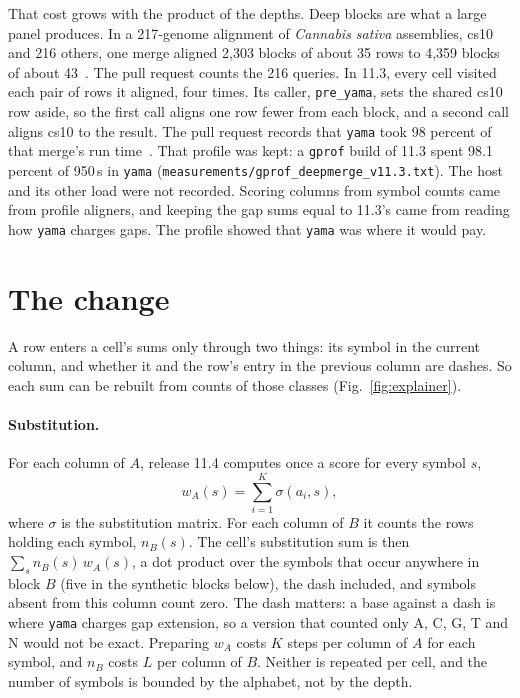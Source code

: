 \documentclass[11pt,letterpaper]{article}
\newcommand{\code}[1]{\texttt{#1}}
\begin{document}
That cost grows with the product of the depths. Deep blocks are what a large panel produces. In a 217-genome alignment of \emph{Cannabis sativa} assemblies, cs10 and 216 others, one merge aligned 2,303 blocks of about 35 rows to 4,359 blocks of about 43~\cite{multiz28}. The pull request counts the 216 queries. In 11.3, every cell visited each pair of rows it aligned, four times. Its caller, \code{pre\_yama}, sets the shared cs10 row aside, so the first call aligns one row fewer from each block, and a second call aligns cs10 to the result. The pull request records
that \code{yama} took 98 percent of that merge's run time~\cite{multiz28}. That profile was kept: a \code{gprof} build of 11.3 spent
98.1 percent of 950\,s in \code{yama} (\code{measurements/gprof\_deepmerge\_v11.3.txt}). The host and its other load
were not recorded. Scoring columns from symbol counts came from profile aligners, and keeping the gap sums equal to 11.3's came from reading how \code{yama} charges gaps. The profile showed that \code{yama} was where it would pay.

\section{The change}

A row enters a cell's sums only through two things: its symbol in the current column, and whether it and the row's
entry in the previous column are dashes. So each sum can be rebuilt from counts of those classes
(Fig.~\ref{fig:explainer}).

\paragraph{Substitution.} For each column of $A$, release 11.4 computes once a score for every symbol $s$,
\[ w_A(s) = \sum_{i=1}^{K} \sigma(a_i, s), \]
where $\sigma$ is the substitution matrix. For each column of $B$ it counts the rows holding each symbol, $n_B(s)$.
The cell's substitution sum is then $\sum_s n_B(s)\, w_A(s)$, a dot product over the symbols that occur anywhere
in block $B$ (five in the synthetic blocks below), the dash included, and symbols absent from this column count zero. The dash matters: a base against a dash is where \code{yama} charges gap extension, so a
version that counted only A, C, G, T and N would not be exact. Preparing $w_A$ costs $K$ steps per column of $A$ for
each symbol, and $n_B$ costs $L$ per column of $B$. Neither is repeated per cell, and the number of symbols is
bounded by the alphabet, not by the depth.
\end{document}

